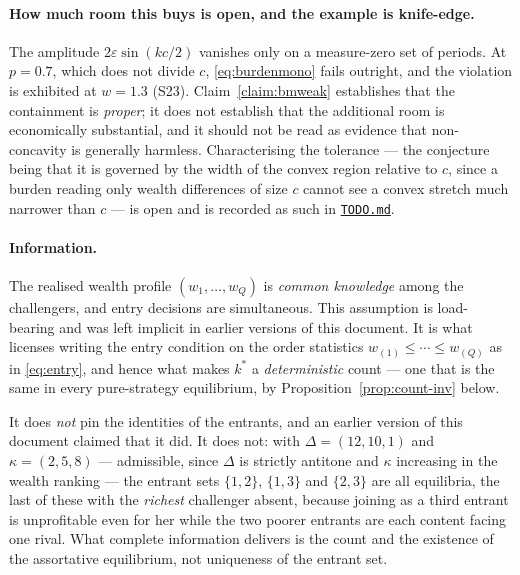 \documentclass[11pt]{article}
\newcommand{\file}[1]{\href{run:#1}{\texttt{#1}}}
\begin{document}
\paragraph{How much room this buys is open, and the example is knife-edge.}
The amplitude $2\varepsilon\sin(kc/2)$ vanishes only on a measure-zero set of
periods. At $p=0.7$, which does not divide $c$, \eqref{eq:burdenmono} fails
outright, and the violation is exhibited at $w=1.3$ (S23). Claim~\ref{claim:bmweak}
establishes that the containment is \emph{proper}; it does not establish that
the additional room is economically substantial, and it should not be read as
evidence that non-concavity is generally harmless. Characterising the
tolerance --- the conjecture being that it is governed by the width of the
convex region relative to $c$, since a burden reading only wealth differences
of size $c$ cannot see a convex stretch much narrower than $c$ --- is open and
is recorded as such in \file{TODO.md}.

\paragraph{Information.} The realised wealth profile
$(w_1,\dots,w_Q)$ is \emph{common knowledge} among the challengers, and
entry decisions are simultaneous. This assumption is load-bearing and was
left implicit in earlier versions of this document. It is what licenses
writing the entry condition on the order statistics $w_{(1)}\le\cdots\le
w_{(Q)}$ as in \eqref{eq:entry}, and hence what makes $k^*$ a
\emph{deterministic} count --- one that is the same in every pure-strategy
equilibrium, by Proposition~\ref{prop:count-inv} below.

It does \emph{not} pin the identities of the entrants, and an earlier version
of this document claimed that it did. It does not: with
$\Delta=(12,10,1)$ and $\kappa=(2,5,8)$ --- admissible, since $\Delta$ is
strictly antitone and $\kappa$ increasing in the wealth ranking --- the
entrant sets $\{1,2\}$, $\{1,3\}$ and $\{2,3\}$ are all equilibria, the last
of these with the \emph{richest} challenger absent, because joining as a third
entrant is unprofitable even for her while the two poorer entrants are each
content facing one rival. What complete information delivers is the count and
the existence of the assortative equilibrium, not uniqueness of the entrant
set.
\end{document}
